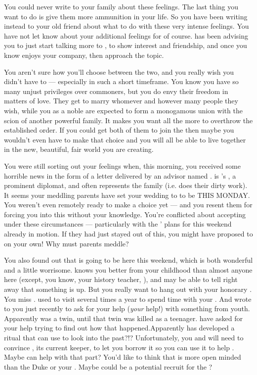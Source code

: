 \documentclass[char]{GL2020}
\begin{document}
You could never write to your family about these feelings.  The last thing you want to do is give them more ammunition in your life.  So you have been writing instead to your old friend \cWildCard{} about what to do with these very intense feelings.  You have not let \cWildcard{} know about your additional feelings for \cPresident{} of course.  \cWildcard{} has been advising you to just start talking more to \cHeir{}, to show interest and friendship, and once you know \cHeir{} enjoys your company, then approach the topic.  

You aren't sure how you'll choose between the two, and you really wish you didn't have to — especially in such a short timeframe. You know you have so many unjust privileges over commoners, but you do envy their freedom in matters of love. They get to marry whomever and however many people they wish, while you as a noble are expected to form a monogamous union with the scion of another powerful family. It makes you want all the more to overthrow the established order. If you could get both of them to join the \pGoaties{} then maybe you wouldn’t even have to make that choice and you will all be able to live together in the new, beautiful, fair world you are creating.
 
You were still sorting out your feelings when, this morning, you received some horrible news in the form of a letter delivered by an advisor named \cDiplomat{\full}. \cDiplomat{} is \cHeir{}’s \cDiplomat{\auncle}, a prominent diplomat, and often represents the family (i.e. does their dirty work). It seems your meddling parents have set your wedding to \cHeir{} to be THIS MONDAY. You weren't even remotely ready to make a choice yet — and you resent them for forcing you into this without your knowledge. You're conflicted about accepting under these circumstances — particularly with the \pGoaties{}’ plans for this weekend already in motion. If they had just stayed out of this, you might have proposed to \cHeir{} on your own!  Why must parents meddle?

You also found out that \cWildCard{} is going to be here this weekend, which is both wonderful and a little worrisome. \cWildCard{} knows you better from your childhood than almost anyone here (except, you know, your history teacher, \cHistory{}), and may be able to tell right away that something is up. But you really want to hang out with your honorary \cWildCard{\auncle}. You miss \cWildCard{\them}. \cWildCard{\They} used to visit several times a year to spend time with your \cWildCardFriend{\parent}. And \cWildCard{\they} wrote to you just recently to ask for your help (\emph{your} help!) with something from \cWildCard{\their} youth. Apparently \cWildCard{} was a twin, until that twin was killed as a teenager. \cWildCard{\They} have asked for your help trying to find out how that happened.Apparently \cWildCard{} has developed a ritual that can use \iMirror{} to look into the past?!? Unfortunately, you and \cWildCard{} will need to convince \cDiplomat{}, its current keeper,  to let you borrow it so you can use it to help \cWildCard{}. Maybe \cHeir{} can help with that part? You’d like to think that \cWildCard{} is more open minded than the Duke or your \cWildCardFriend{\parent}. Maybe \cWildCard{} could be a potential recruit for the \pGoaties{}?  
\end{document}
